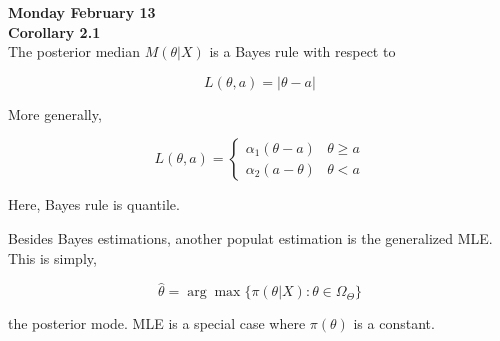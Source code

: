 \documentclass[11pt,fleqn]{book} %
\begin{document}
\textbf{Monday February 13}\\

\textbf{Corollary 2.1}\\

The posterior median $M(\theta|X)$ is a Bayes rule with respect to 

		$$L(\theta, a) = |\theta - a| $$


More generally, 

		$$L(\theta, a) = \left\{ \begin{array}{ll}
			\alpha_1(\theta - a) & \theta \geq a\\
			\alpha_2(a - \theta) & \theta < a
		\end{array} \right. $$

Here, Bayes rule is quantile. 


Besides Bayes estimations, another populat estimation is the generalized MLE. This is simply, 

		$$\hat{\theta} = \arg\max \{\pi(\theta| X) : \theta \in \Omega_\Theta\} $$

the posterior mode. MLE is a special case where $\pi(\theta)$ is a constant. \\
\end{document}
